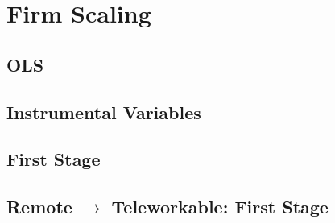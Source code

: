 \documentclass{article}
\newcommand{\cleanedresultsdir}{../../results/cleaned}
\begin{document}

\clearpage
\section{Firm Scaling}

\subsection{OLS}


\subsection{Instrumental Variables}


\subsection{First Stage}


% 

% 

\subsection{Remote $\rightarrow$ Teleworkable: First Stage}

\end{document}
